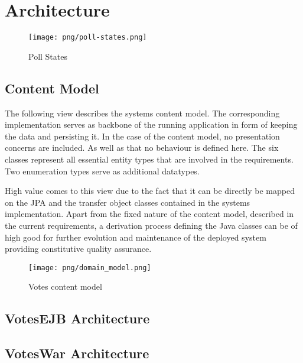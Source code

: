 \section{Architecture}

\begin{figure}
\centering
\texttt{[image: png/poll-states.png]}
\caption{Poll States}
\end{figure}

\subsection{Content Model}
The following view describes the systems content model. The corresponding implementation serves as backbone of the running application in form of keeping the data and persisting it. In the case of the content model, no presentation concerns are included. As well as that no behaviour is defined here. The six classes represent all essential entity types that are involved in the requirements. Two enumeration types serve as additional datatypes. 

High value comes to this view due to the fact that it can be directly be mapped on the JPA and the transfer object classes contained in the systems implementation. Apart from the fixed nature of the content model, described in the current requirements, a derivation process defining the Java classes can be of high good for further evolution and maintenance of the deployed system providing constitutive quality assurance.

\begin{figure}
\centering
\texttt{[image: png/domain\_model.png]}
\caption{Votes content model}
\end{figure}


\subsection{VotesEJB Architecture}
\subsection{VotesWar Architecture}
